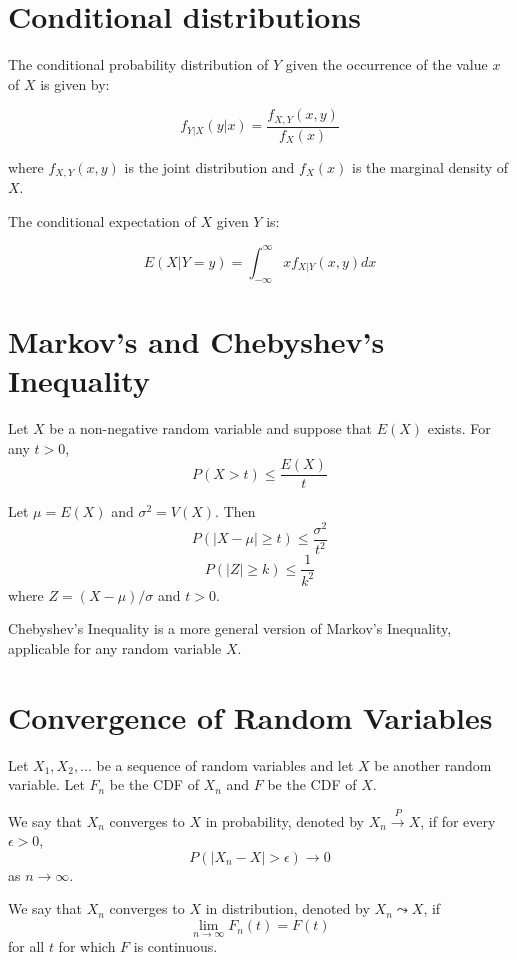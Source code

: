\documentclass[12pt,letterpaper]{amsbook}
\theoremstyle{definition}
\begin{document}
\section{Conditional distributions}

The conditional probability distribution of $Y$ given the occurrence of the value $x$ of $X$ is given by:

\[ f_{Y|X} (y|x) = \frac{f_{X,Y}(x,y)}{f_X(x)}\]

where $f_{X,Y}(x,y)$ is the joint distribution and $f_X(x)$ is the marginal density of $X$.

The conditional expectation of $X$ given $Y$ is:

\[E(X|Y=y) = \int_{-\infty}^{\infty} x f_{X|Y}(x,y) dx \]

\section{Markov's and Chebyshev's Inequality}

\begin{theorem}
  Let $X$ be a non-negative random variable and suppose that $E(X)$ exists. For any $t > 0$, 
  \[P(X > t) \leq \frac{E(X)}{t}\]
\end{theorem}

\begin{theorem}
  Let $\mu = E(X)$ and $\sigma^2 = V(X)$. Then
  \[P(|X-\mu| \geq t) \leq \frac{\sigma^2}{t^2}\]
  \[ P(|Z| \geq k) \leq \frac{1}{k^2}\]
  where $Z = (X-\mu) / \sigma$ and $t > 0$.
\end{theorem}

Chebyshev's Inequality is a more general version of Markov's Inequality, applicable for any random variable $X$.

\section{Convergence of Random Variables}

Let $X_1,X_2,...$ be a sequence of random variables and let $X$ be another random variable. Let $F_n$ be the CDF of $X_n$ and $F$ be the CDF of $X$.

We say that $X_n$ converges to $X$ in probability, denoted by $X_n \xrightarrow{P} X$, if for every $\epsilon > 0$,
\[P(|X_n-X| > \epsilon) \rightarrow 0\]
as $n \rightarrow \infty$.

We say that $X_n$ converges to $X$ in distribution, denoted by $X_n \leadsto X$, if
\[ \lim_{n \rightarrow \infty} F_n(t) = F(t)\]
for all $t$ for which $F$ is continuous.
\end{document}

